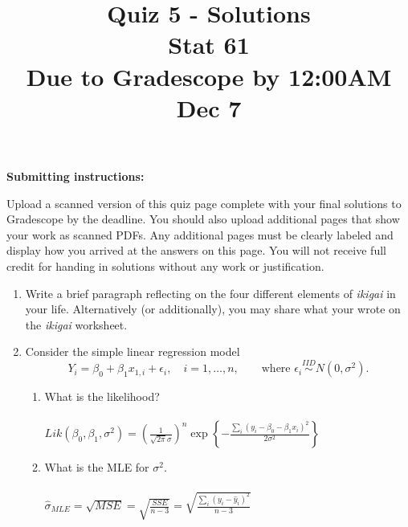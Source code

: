 \documentclass[12pt]{article}
\title{Quiz 5 - Solutions\\
Stat 61\\ 
Due to Gradescope by 12:00AM Dec 7
}
\date{}
\begin{document}
\maketitle
\vspace{-2.2cm}
\noindent \textbf{Submitting instructions:} 

\noindent Upload a scanned version of this quiz page complete with your final solutions to Gradescope by the deadline. You should also upload additional pages that show your work as scanned PDFs. Any additional pages must be clearly labeled and display how you arrived at the answers on this page. You will not receive full credit for handing in solutions without any work or justification. 

\vspace{0.5cm}

\begin{enumerate}[leftmargin=\labelsep]
\item Write a brief paragraph reflecting on the four different elements of {\it ikigai} in your life. Alternatively (or additionally), you may share what your wrote on the {\it ikigai} worksheet.

\vspace{5cm}

\item Consider the simple linear regression model 
$$Y_i = \beta_0 + \beta_1 x_{1,i}  + \epsilon_i, \quad i=1,\dots,n, \quad \quad
\text{where }\epsilon_i \stackrel{IID}{\sim} N(0, \sigma^2).$$ 

\begin{enumerate}
\item What is the likelihood? \\
\vspace{.6cm}\\
$Lik(\beta_0, \beta_1, \sigma^2) = \left(\frac{1}{\sqrt{2\pi }\sigma}\right)^n\exp\left\{- \frac{\sum_{i}(y_i - \beta_0 - \beta_1 x_{i})^2}{2\sigma^2} \right\}$

\item What is the MLE for $\sigma^2$. \\
\vspace{.6cm}\\
$\hat{\sigma}_{MLE} =\sqrt{MSE} = \sqrt{\frac{SSE}{n-3}} = \sqrt{\frac{\sum_{i}(y_i - \hat{y}_i)^2}{n-3}}$

\end{enumerate}

\end{enumerate}
\end{document}
